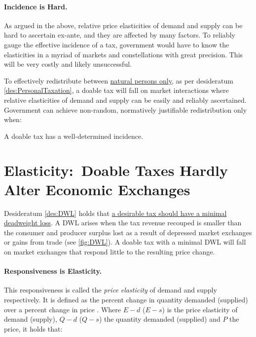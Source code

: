 \paragraph{Incidence is Hard.}
As argued in the above, relative price elasticities of demand and supply can be hard to ascertain ex-ante, and they are affected by many factors.
To reliably gauge the effective incidence of a tax, government would have to know the elasticities in a myriad of markets and constellations with great precision.
This will be very costly and likely unsuccessful.


To effectively redistribute between \href{des:PersonalTaxation}{natural persons only}, as per desideratum \ref{des:PersonalTaxation}, a doable tax will fall on market interactions where relative elasticities of demand and supply can be easily and reliably ascertained.
Government can achieve non-random, normatively justifiable redistribution only when:

\begin{desideratum}
	A doable tax has a well-determined incidence.
	\label{des:TaxIncidence}
\end{desideratum}

\section[Elasticity]{Elasticity:~Doable Taxes Hardly Alter Economic Exchanges}
	\label{sec:tax-elasticity}
Desideratum \ref{des:DWL} holds that \href{des:DWL}{a desirable tax should have a minimal deadweight loss}.
A DWL arises when the tax revenue recouped is smaller than the consumer and producer surplus lost as a result of depressed market exchanges or gains from trade (see \autoref{fig:DWL}).
A doable tax with a minimal DWL will fall on market exchanges that respond little to the resulting price change.

\paragraph{Responsiveness is Elasticity.}
This responsiveness is called the \emph{price elasticity} of demand and supply respectively.
It is defined as the percent change in quantity demanded (supplied) over a percent change in price \citep{Marshall1890}.
Where $E-{d}$ ($E-{s}$)  is the price elasticity of demand (supply), $Q-{d}$ ($Q-{s}$) the quantity demanded (supplied) and $P$ the price, it holds that:

